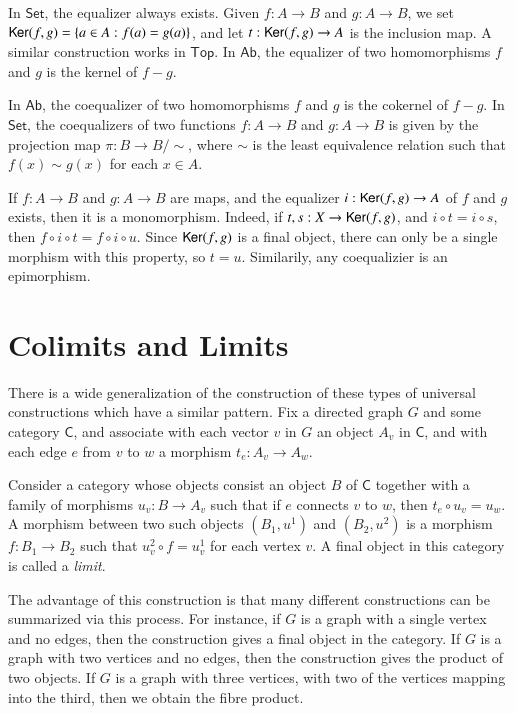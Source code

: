 \begin{example}
    In $\mathsf{Set}$, the equalizer always exists. Given $f: A \to B$ and $g: A \to B$, we set $\operatorname{\textsf{Ker}}(f,g) = \{ a \in A: f(a) = g(a) \}$, and let $t: \operatorname{\textsf{Ker}}(f,g) \to A$ is the inclusion map. A similar construction works in $\mathsf{Top}$. In $\mathsf{Ab}$, the equalizer of two homomorphisms $f$ and $g$ is the kernel of $f - g$.
\end{example}

\begin{example}
    In $\mathsf{Ab}$, the coequalizer of two homomorphisms $f$ and $g$ is the cokernel of $f - g$. In $\mathsf{Set}$, the coequalizers of two functions $f: A \to B$ and $g: A \to B$ is given by the projection map $\pi: B \to B/\sim$, where $\sim$ is the least equivalence relation such that $f(x) \sim g(x)$ for each $x \in A$.
\end{example}

If $f: A \to B$ and $g: A \to B$ are maps, and the equalizer $i: \operatorname{\textsf{Ker}}(f,g) \to A$ of $f$ and $g$ exists, then it is a monomorphism. Indeed, if $t,s: X \to \operatorname{\textsf{Ker}}(f,g)$, and $i \circ t = i \circ s$, then $f \circ i \circ t = f \circ i \circ u$. Since $\operatorname{\textsf{Ker}}(f,g)$ is a final object, there can only be a single morphism with this property, so $t = u$. Similarily, any coequalizier is an epimorphism.



\section{Colimits and Limits}

There is a wide generalization of the construction of these types of universal constructions which have a similar pattern. Fix a directed graph $G$ and some category $\mathsf{C}$, and associate with each vector $v$ in $G$ an object $A_v$ in $\mathsf{C}$, and with each edge $e$ from $v$ to $w$ a morphism $t_e: A_v \to A_w$.

Consider a category whose objects consist an object $B$ of $\mathsf{C}$ together with a family of morphisms $u_v: B \to A_v$ such that if $e$ connects $v$ to $w$, then $t_e \circ u_v = u_w$. A morphism between two such objects $(B_1,u^1)$ and $(B_2,u^2)$ is a morphism $f: B_1 \to B_2$ such that $u_v^2 \circ f = u_v^1$ for each vertex $v$. A final object in this category is called a \emph{limit}.

The advantage of this construction is that many different constructions can be summarized via this process. For instance, if $G$ is a graph with a single vertex and no edges, then the construction gives a final object in the category. If $G$ is a graph with two vertices and no edges, then the construction gives the product of two objects. If $G$ is a graph with three vertices, with two of the vertices mapping into the third, then we obtain the fibre product.

